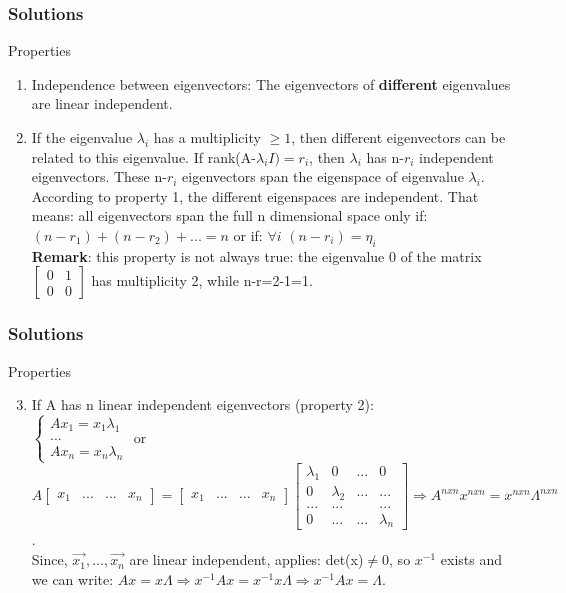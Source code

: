 \begin{frame}
	\frametitle{Solutions}
	\begin{block}{Properties}
		\begin{enumerate}
			\item Independence  between eigenvectors: The eigenvectors of \textbf{different} eigenvalues are linear independent. 
			\item If the eigenvalue $\lambda_i$ has a multiplicity $\geq 1$, then different eigenvectors can be related to this eigenvalue. If rank(A-$\lambda_i I)=r_i$, then $\lambda_i$ has n-$r_i$ independent eigenvectors. These n-$r_i$ eigenvectors span the eigenspace of eigenvalue $\lambda_i$.\\
			According to property 1, the different eigenspaces are independent. That means: all eigenvectors span the full n dimensional space only if:\\ $(n-r_1)+(n-r_2)+...=n$ or if: $\forall i$ $ (n-r_i)=\eta_i$\\
			\textbf{Remark}: this property is not always true: the eigenvalue 0 of the matrix $\begin{bmatrix}
			0 & 1\\0 & 0
			\end{bmatrix}$ has multiplicity 2, while n-r=2-1=1.
		\end{enumerate}
	\end{block}
\end{frame}

\begin{frame}
	\frametitle{Solutions}
	\begin{block}{Properties}
		\begin{enumerate}
			\setcounter{enumi}{2}
			\item If A  has n linear independent eigenvectors (property 2):\\
				$\begin{cases} Ax_1=x_1\lambda_1\\...\\Ax_n=x_n\lambda_n \end{cases}$ or $A\begin{bmatrix}
				x_1 & ... &...& x_n
				\end{bmatrix}=\begin{bmatrix}
				x_1 & ...&... & x_n
				\end{bmatrix}\begin{bmatrix}
				\lambda_1 & 0 &...& 0\\
				0&\lambda_2 & ... & ...\\
				...& ... & &...\\
				0&...&...&\lambda_n
				\end{bmatrix} \Rightarrow A^{nxn}x^{nxn}=x^{nxn}\Lambda^{nxn}$. \\
				Since, $\overrightarrow{x_1},...,\overrightarrow{x_n}$ are linear independent, applies: det(x)$\neq$0, so $x^{-1}$ exists and we can write: $Ax=x\Lambda \Rightarrow x^{-1} Ax=x^{-1}x\Lambda \Rightarrow x^{-1} Ax=\Lambda$.
		\end{enumerate}
	\end{block}
\end{frame}

